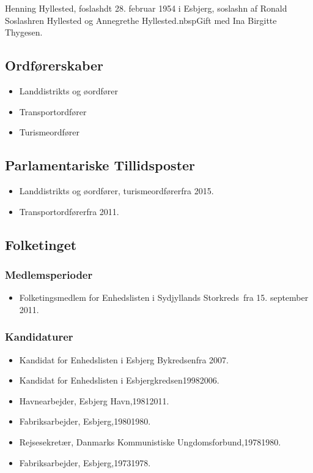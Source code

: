 \documentclass[11pt, a4paper]{awesome-cv}
\begin{document}
\makecvheader[R]
\makelettertitle
\begin{cvletter}
Henning Hyllested, foslashdt 28. februar 1954 i Esbjerg, soslashn af Ronald Soslashren Hyllested og Annegrethe Hyllested.nbspGift med Ina Birgitte Thygesen.

\subsection*{Ordførerskaber}
\begin{itemize}
\item Landdistrikts og øordfører
\item Transportordfører
\item Turismeordfører
\end{itemize}
\subsection*{Parlamentariske Tillidsposter}
\begin{itemize}
\item Landdistrikts og øordfører, turismeordførerfra 2015.
\item Transportordførerfra 2011.
\end{itemize}
\subsection*{Folketinget}
\subsubsection*{Medlemsperioder}
\begin{itemize}
\item Folketingsmedlem for Enhedslisten i Sydjyllands Storkreds fra 15. september 2011.
\end{itemize}
\subsubsection*{Kandidaturer}
\begin{itemize}
\item Kandidat for Enhedslisten i Esbjerg Bykredsenfra 2007.
\item Kandidat for Enhedslisten i Esbjergkredsen19982006.
\end{itemize}
\begin{itemize}
\item Havnearbejder, Esbjerg Havn,19812011.
\item Fabriksarbejder, Esbjerg,19801980.
\item Rejsesekretær, Danmarks Kommunistiske Ungdomsforbund,19781980.
\item Fabriksarbejder, Esbjerg,19731978.
\end{itemize}
\end{cvletter}
\end{document}
